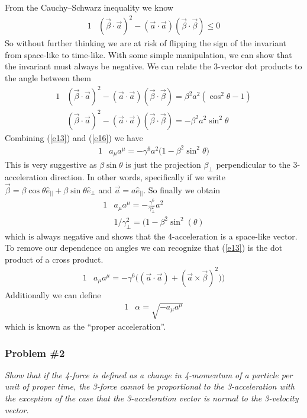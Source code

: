 \documentclass[]{article}
\numberwithin{equation}{subsection}
\begin{document}
From the Cauchy–Schwarz inequality we know
\begin{alignat}{1}
	\label{e14}	&(\vec{\beta}\cdot\vec{a})^{2}-(\vec{a}\cdot\vec{a})(\vec{\beta}\cdot\vec{\beta})\leq 0
\end{alignat}
So without further thinking we are at risk of flipping the sign of the invariant from space-like to time-like. With some simple manipulation, we can show that the invariant must always be negative. We can relate the 3-vector dot products to the angle between them
\begin{alignat}{1}
	\label{e15}	&(\vec{\beta}\cdot\vec{a})^{2}-(\vec{a}\cdot\vec{a})(\vec{\beta}\cdot\vec{\beta})=\beta^{2}a^{2}(\cos^{2}\theta-1)\\
	\label{e16}	&(\vec{\beta}\cdot\vec{a})^{2}-(\vec{a}\cdot\vec{a})(\vec{\beta}\cdot\vec{\beta})=-\beta^{2}a^{2}\sin^{2}\theta
\end{alignat}
Combining (\ref{e13}) and (\ref{e16}) we have  
	\begin{alignat}{1}
	\label{e17}	&a_{\mu}a^{\mu}=-\gamma^{6}a^{2}\Big(1-\beta^{2}\sin^{2}\theta\Big)
	\end{alignat}
This is very suggestive as $\beta\sin\theta$ is just the projection $\beta_{\perp}$ perpendicular to the 3-acceleration direction. In other words, specifically if we write $\vec{\beta}=\beta\cos{\theta}\hat{e}_{||}+\beta\sin{\theta}\hat{e}_{\perp}$ and $\vec{a}=a\hat{e}_{||}$. So finally we obtain  
\begin{alignat}{1}
	\label{e18}	&a_{\mu}a^{\mu}=-\frac{\gamma^{6}}{\gamma^{2}_{\perp}}a^{2}\\
	\label{ee01}	&1/\gamma_{\perp}^{2}=(1-\beta^{2}\sin^{2}(\theta)
\end{alignat}
which is always negative and shows that the 4-acceleration is a space-like vector. To remove our dependence on angles we can recognize that (\ref{e13}) is the dot product of a cross product.
\begin{alignat}{1}
	\label{ee02}	&a_{\mu}a^{\mu}=-\gamma^{6}\Big((\vec{a}\cdot\vec{a})+(\vec{a}\times\vec{\beta})^{2})\Big)
\end{alignat}
Additionally we can define  
\begin{alignat}{1}
	\label{e19}	&\alpha=\sqrt{-a_{\mu}a^{\mu}}
\end{alignat}
which is known as the ``proper acceleration''.
\subsubsection*{Problem \#2}
\emph{Show that if the 4-force is defined as a change in 4-momentum of a particle per unit of proper time, the 3-force cannot be proportional to the 3-acceleration with the exception of the case that the 3-acceleration vector is normal to the 3-velocity vector.}\\
\end{document}
